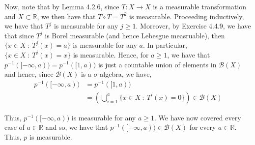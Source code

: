 \documentclass[12pt]{article}
\newenvironment{problem}[2][Problem]{\begin{trivlist}
\item[\hskip \labelsep {\bfseries #1}\hskip \labelsep {\bfseries #2.}]}{\end{trivlist}}
\begin{document}
Now, note that by Lemma 4.2.6, since $T: X \to X$ is a measurable transformation and $X \subset \mathbb{R}$, we then have that $T \circ T = T^2$ is measurable. Proceeding inductively, we have that $T^j$ is measurable for any $j \geq 1$. Moreover, by Exercise 4.4.9, we have that since $T^j$ is Borel measurable (and hence Lebesgue measruable), then $\{x \in X \ : \ T^j(x) = a\}$ is measurable for any $a$. In particular, $\{x \in X \ : \ T^j(x) = x\}$ is measurable. Hence, for $a \geq 1$, we have that $p^{-1}([-\infty, a)) = p^{-1}([1, a))$ is just a countable union of elements in $\mathcal{B}(X)$ and hence, since $\mathcal{B}(X)$ is a $\sigma$-algebra, we have,
\begin{align*}
p^{-1}([-\infty, a)) &= p^{-1}([1, a))\\
&= \left(\bigcup_{i=1}^a \{x \in X \ : \ T^i(x) = 0\}\right) \in \mathcal{B}(X)
\end{align*}

Thus, $p^{-1}([-\infty, a))$ is measurable for any $a \geq 1$. We have now covered every case of $a \in \mathbb{R}$ and so, we have that $p^{-1}([-\infty, a)) \in \mathcal{B}(X)$ for every $a \in \mathbb{R}$. Thus, $p$ is measurable.

\begin{problem}{5}
\end{problem}
\end{document}
